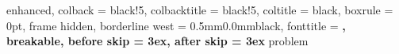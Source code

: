 \usepackage{titlesec}
\usepackage[many]{tcolorbox}

\titlespacing*{\chapter}{0cm}{-2.0cm}{0.50cm}
\titlespacing*{\section}{0cm}{0.50cm}{0.25cm}

\setlength{\parindent}{0pt}
\setlength{\parskip}{1ex}


%
    {enhanced,
    colback = black!5, %
    colbacktitle = black!5,
    coltitle = black,
    boxrule = 0pt,
    frame hidden,
    borderline west = {0.5mm}{0.0mm}{black},
    fonttitle = \bfseries\sffamily,
    breakable,
    before skip = 3ex,
    after skip = 3ex
}{problem}


